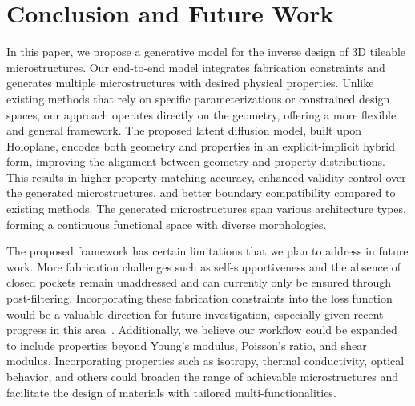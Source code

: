  \section{Conclusion and Future Work}
 \label{sec:conclusion}

In this paper, we propose a generative model for the inverse design of 3D tileable microstructures. 
Our end-to-end model integrates fabrication constraints and generates multiple microstructures with desired physical properties. 
Unlike existing methods that rely on specific parameterizations or constrained design spaces, our approach operates directly on the geometry, offering a more flexible and general framework. The proposed latent diffusion model, built upon Holoplane, encodes both geometry and properties in an explicit-implicit hybrid form, improving the alignment between geometry and property distributions.
This results in higher property matching accuracy, enhanced validity control over the generated microstructures, and better boundary compatibility compared to existing methods. The generated microstructures span various architecture types, forming a continuous functional space with diverse morphologies.



The proposed framework has certain limitations that we plan to address in future work. More fabrication challenges such as self-supportiveness and the absence of closed pockets remain unaddressed and can currently only be ensured through post-filtering. Incorporating these fabrication constraints into the loss function would be a valuable direction for future investigation, especially given recent progress in this area~\cite{Chen2024,Guo2024PhysComp}.
Additionally, we believe our workflow could be expanded to include properties beyond Young's modulus, Poisson's ratio, and shear modulus. Incorporating properties such as isotropy, thermal conductivity, optical behavior, and others could broaden the range of achievable microstructures and facilitate the design of materials with tailored multi-functionalities.

